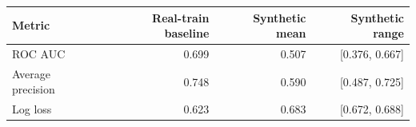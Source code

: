 \AccessibleTableHeaderRow
\begin{tabular}{@{}lrrr@{}}
\toprule
Metric & Real-train baseline & Synthetic mean & Synthetic range \\
\midrule
ROC AUC & 0.699 & 0.507 & [0.376, 0.667] \\
Average precision & 0.748 & 0.590 & [0.487, 0.725] \\
Log loss & 0.623 & 0.683 & [0.672, 0.688] \\
\bottomrule
\end{tabular}
